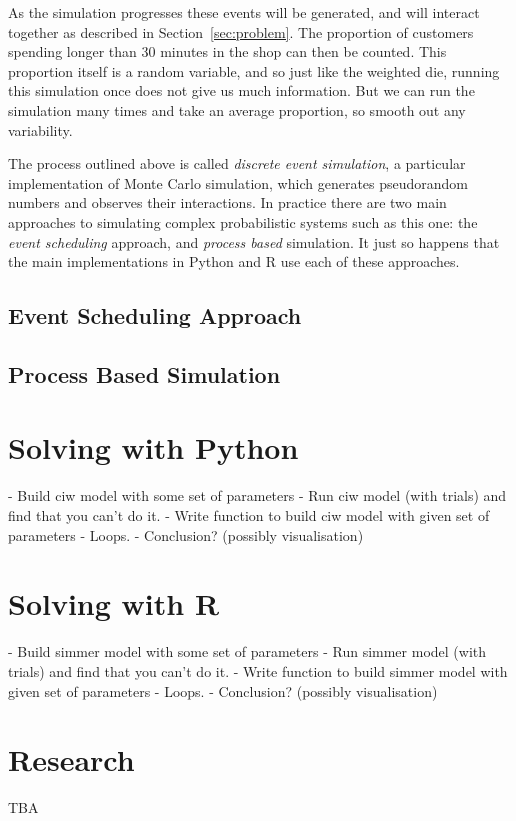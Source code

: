 As the simulation progresses these events will be generated, and will interact
together as described in Section~\ref{sec:problem}.
The proportion of customers spending longer than 30 minutes in the shop can then
be counted. This proportion itself is a random variable, and so just like the
weighted die, running this simulation once does not give us much information.
But we can run the simulation many times and take an average proportion, so
smooth out any variability.

The process outlined above is called \textit{discrete event simulation}, a
particular implementation of Monte Carlo simulation, which generates
pseudorandom numbers and observes their interactions. In practice there are two
main approaches to simulating complex probabilistic systems such as this one:
the \textit{event scheduling} approach, and \textit{process based} simulation.
It just so happens that the main implementations in Python and R use each of
these approaches.

\subsection{Event Scheduling Approach}

\subsection{Process Based Simulation}


\section{Solving with Python}\label{sec:solving-with-python}

- Build ciw model with some set of parameters
- Run ciw model (with trials) and find that you can't do it.
- Write function to build ciw model with given set of parameters
- Loops.
- Conclusion? (possibly visualisation)


\section{Solving with R}\label{sec:solving-with-R}

- Build simmer model with some set of parameters
- Run simmer model (with trials) and find that you can't do it.
- Write function to build simmer model with given set of parameters
- Loops.
- Conclusion? (possibly visualisation)

\section{Research}\label{sec:research}

TBA
